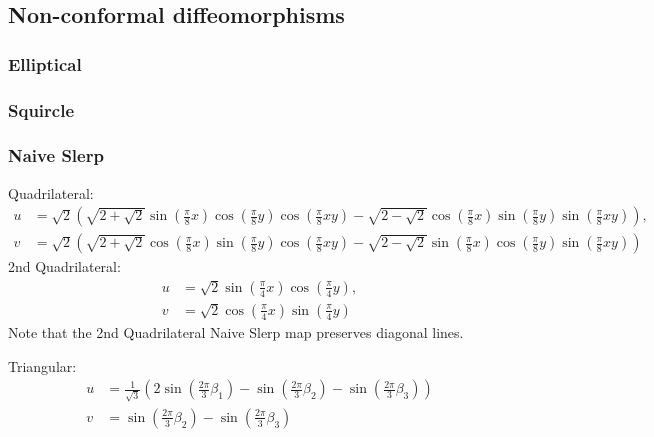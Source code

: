 \documentclass{amsart}[12pt]
\begin{document}
\subsection{Non-conformal diffeomorphisms}
\subsubsection{Elliptical}

\subsubsection{Squircle}

\subsubsection{Naive Slerp}

Quadrilateral:
\begin{equation}\begin{split}
u &= \sqrt 2 \left(\sqrt{2+\sqrt 2} \sin \left( \frac{\pi}{8} x \right)
\cos \left( \frac{\pi}{8} y \right) \cos \left( \frac{\pi}{8} xy \right)
- \sqrt{2-\sqrt 2} \cos \left( \frac{\pi}{8} x \right) \sin
\left( \frac{\pi}{8} y \right) \sin \left( \frac{\pi}{8} xy \right)\right), \\
v &= \sqrt 2 \left(\sqrt{2+\sqrt 2} \cos \left( \frac{\pi}{8} x \right)
\sin \left( \frac{\pi}{8} y \right) \cos \left( \frac{\pi}{8} xy \right)
- \sqrt{2-\sqrt 2} \sin \left( \frac{\pi}{8} x \right)
\cos \left( \frac{\pi}{8} y \right) \sin \left( \frac{\pi}{8} xy \right)\right)
\end{split}\end{equation}
2nd Quadrilateral:
\begin{equation}\begin{split}
u &= \sqrt 2
\sin \left(\frac{\pi}{4}x\right) \cos \left(\frac{\pi}{4}y\right),\\
v &= \sqrt 2 \cos \left(\frac{\pi}{4}x\right) \sin \left(\frac{\pi}{4}y\right)
\end{split}\end{equation}
Note that the 2nd Quadrilateral Naive Slerp map preserves diagonal lines.

Triangular:
\begin{equation}\begin{split}
u& =  \frac{1}{\sqrt{3}} \left(2 \sin\left(\frac{2\pi}{3} \beta_1 \right)
- \sin\left(\frac{2\pi}{3} \beta_2 \right)
- \sin\left(\frac{2\pi}{3} \beta_3 \right) \right)\\
v& = \sin\left(\frac{2\pi}{3} \beta_2 \right)
- \sin\left(\frac{2\pi}{3} \beta_3 \right)
\end{split}
\end{equation}
\end{document}
